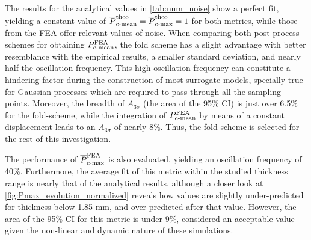 \documentclass[12pt,number,preprint,review,times]{elsarticle}
\begin{document}
The results for the analytical values in \cref{tab:num_noise} show a perfect fit, yielding a constant value of $\overline{P}^{\mathrm{theo}}_{\mathrm{c{\text -}mean}} = \overline{P}^{\mathrm{theo}}_{\mathrm{c{\text -}max}} = 1$ for both metrics, while those from the FEA offer relevant values of noise. When comparing both post-process schemes for obtaining ${P}^{\mathrm{FEA}}_{\mathrm{c{\text -}mean}}$, the fold scheme has a slight advantage with better resemblance with the empirical results, a smaller standard deviation, and nearly half the oscillation frequency. This high oscillation frequency can constitute a hindering factor during the construction of most surrogate models, specially true for Gaussian processes which are required to pass through all the sampling points. Moreover, the breadth of $A_{3 \sigma}$ (the area of the 95\% CI) is just over 6.5\% for the fold-scheme, while the integration of ${P}^{\mathrm{FEA}}_{\mathrm{c{\text -}mean}}$ by means of a constant displacement leads to an $A_{3 \sigma}$ of nearly 8\%. Thus, the fold-scheme is selected for the rest of this investigation.

The performance of $\overline{P}^{\mathrm{FEA}}_{\mathrm{c{\text -}max}}$ is also evaluated, yielding an oscillation frequency of 40\%. Furthermore, the average fit of this metric within the studied thickness range is nearly that of the analytical results, although a closer look at \cref{fig:Pmax_evolution_normalized} reveals how values are slightly under-predicted for thickness below 1.85 mm, and over-predicted after that value. However, the area of the 95\% CI for this metric is under 9\%, considered an acceptable value given the non-linear and dynamic nature of these simulations.
\end{document}

